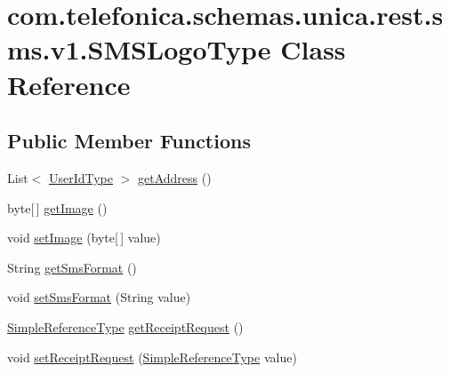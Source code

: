 \hypertarget{classcom_1_1telefonica_1_1schemas_1_1unica_1_1rest_1_1sms_1_1v1_1_1SMSLogoType}{
\section{com.telefonica.schemas.unica.rest.sms.v1.SMSLogoType Class Reference}
\label{classcom_1_1telefonica_1_1schemas_1_1unica_1_1rest_1_1sms_1_1v1_1_1SMSLogoType}
}
\subsection*{Public Member Functions}
\begin{DoxyCompactItemize}
\item 
List$<$ \hyperlink{classcom_1_1telefonica_1_1schemas_1_1unica_1_1rest_1_1common_1_1v1_1_1UserIdType}{UserIdType} $>$ \hyperlink{classcom_1_1telefonica_1_1schemas_1_1unica_1_1rest_1_1sms_1_1v1_1_1SMSLogoType_a3a4626ebc2f4e442a6f8fcd6ef632afa}{getAddress} ()
\item 
byte\mbox{[}$\,$\mbox{]} \hyperlink{classcom_1_1telefonica_1_1schemas_1_1unica_1_1rest_1_1sms_1_1v1_1_1SMSLogoType_a57a0ef84719cbcf178692cba798e890e}{getImage} ()
\item 
void \hyperlink{classcom_1_1telefonica_1_1schemas_1_1unica_1_1rest_1_1sms_1_1v1_1_1SMSLogoType_a66097e57e0e5f0409bbe5cfd33b02ca0}{setImage} (byte\mbox{[}$\,$\mbox{]} value)
\item 
String \hyperlink{classcom_1_1telefonica_1_1schemas_1_1unica_1_1rest_1_1sms_1_1v1_1_1SMSLogoType_a73d4c933097073d4173c8f555305f8b9}{getSmsFormat} ()
\item 
void \hyperlink{classcom_1_1telefonica_1_1schemas_1_1unica_1_1rest_1_1sms_1_1v1_1_1SMSLogoType_ac6bc49915438f3e235ae1d45d520dbf3}{setSmsFormat} (String value)
\item 
\hyperlink{classcom_1_1telefonica_1_1schemas_1_1unica_1_1rest_1_1common_1_1v1_1_1SimpleReferenceType}{SimpleReferenceType} \hyperlink{classcom_1_1telefonica_1_1schemas_1_1unica_1_1rest_1_1sms_1_1v1_1_1SMSLogoType_ae3630f0845241d81598f35c131a5beae}{getReceiptRequest} ()
\item 
void \hyperlink{classcom_1_1telefonica_1_1schemas_1_1unica_1_1rest_1_1sms_1_1v1_1_1SMSLogoType_a881541c433d624837f3dc529c9cfbbe1}{setReceiptRequest} (\hyperlink{classcom_1_1telefonica_1_1schemas_1_1unica_1_1rest_1_1common_1_1v1_1_1SimpleReferenceType}{SimpleReferenceType} value)
\item 

\end{DoxyCompactItemize}
